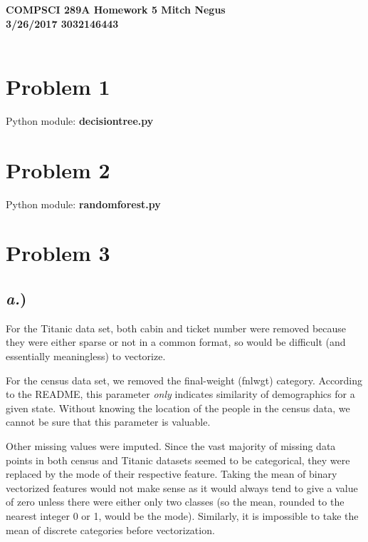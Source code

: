 \documentclass{report}
\begin{document}
\thispagestyle{empty}

{\bf {\large {COMPSCI 289A} Homework {5} \hfill Mitch Negus\\
		3/26/2017 						\hfill	3032146443}}\\\\


\section*{Problem 1}

{\large Python module: \textbf{decisiontree.py}}\\



\newpage
\section*{Problem 2}

{\large Python module: \textbf{randomforest.py}}\\



\newpage
\section*{Problem 3}

\subsection*{\textit{a.})}

For the Titanic data set, both cabin and ticket number were removed because they were either sparse or not in a common format, so would be difficult (and essentially meaningless) to vectorize.

For the census data set, we removed the final-weight (fnlwgt) category. According to the README, this parameter \textit{only} indicates similarity of demographics for a given state. Without knowing the location of the people in the census data, we cannot be sure that this parameter is valuable.

Other missing values were imputed. Since the vast majority of missing data points in both census and Titanic datasets seemed to be categorical, they were replaced by the mode of their respective feature. Taking the mean of binary vectorized features would not make sense as it would always tend to give a value of zero unless there were either only two classes (so the mean, rounded to the nearest integer 0 or 1, would be the mode). Similarly, it is impossible to take the mean of discrete categories before vectorization.
\end{document}
